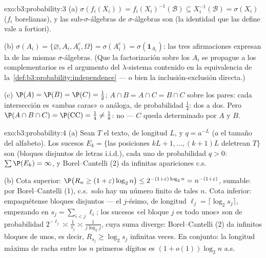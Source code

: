 \begin{solution}{exo:b3:probability:3}
(a) $\sigma(f_i(X_i)) = f_i(X_i)^{-1}(\mathcal B) \subseteq
X_i^{-1}(\mathcal B) = \sigma(X_i)$ ($f_i$ borelianas), y las
sub-$\sigma$-álgebras de $\sigma$-álgebras
 son
 (la identidad
que las define vale a fortiori).

(b) $\sigma(A_i) = \{\varnothing, A_i, A_i^c, \Omega\} =
\sigma(A_i^c) = \sigma(\mathbf 1_{A_i})$: las tres afirmaciones expresan
la  de las mismas
$\sigma$-álgebras. (Que la factorización sobre los $A_i$ se propague a
los complementarios es el argumento del $\lambda$-sistema contenido en
la equivalencia de la~\cref{def:b3:probability:independence} --- o bien
la inclusión-exclusión directa.)

(c) $\P(A) = \P(B) = \P(C) = \frac12$; $A\cap B = A\cap C =
B\cap C$ sobre los pares: cada intersección es «ambas caras» o análoga,
de probabilidad $\frac14$:
 dos a dos. Pero
$\P(A\cap B\cap C) = \P(\text{CC}) = \frac14 \neq
\frac18$: no 
--- $C$ queda determinado por $A$ y
$B$.
\end{solution}

\begin{solution}{exo:b3:probability:4}
(a) Sean $T$ el texto, de longitud $L$, y $q = a^{-L}$ ($a$ el tamaño
del alfabeto). Los sucesos $E_k = \{$las posiciones $kL+1,
\dots, (k+1)L$ deletrean $T\}$ son
 (bloques
disjuntos de letras i.i.d.), cada uno de probabilidad $q > 0$:
$\sum\P(E_k)
= \infty$, y Borel--Cantelli (2) da infinitas apariciones c.s.

(b) Cota superior: $\P\bigl(R_n \geq (1+\varepsilon)\log_2n\bigr)
\leq 2^{-(1+\varepsilon)\log_2n} = n^{-(1+\varepsilon)}$, sumable: por
Borel--Cantelli (1), c.s.\ solo hay un número finito de tales $n$. Cota
inferior: empaquétense bloques disjuntos --- el $j$-ésimo, de longitud
$\ell_j = \lceil\log_2s_j\rceil$, empezando en $s_j =
\sum_{i<j}\ell_i$; los sucesos «el bloque $j$ es todo unos» son
 de probabilidad
$2^{-\ell_j} \asymp
\frac1{s_j} \asymp \frac1{j\log_2 j}$, cuya suma diverge:
Borel--Cantelli (2) da infinitos bloques de unos, es decir,
$R_{s_j} \geq \log_2 s_j$ infinitas veces. En conjunto: la longitud
máxima de racha entre los $n$ primeros dígitos es
$(1 + o(1))\log_2n$ a.s.
\end{solution}

